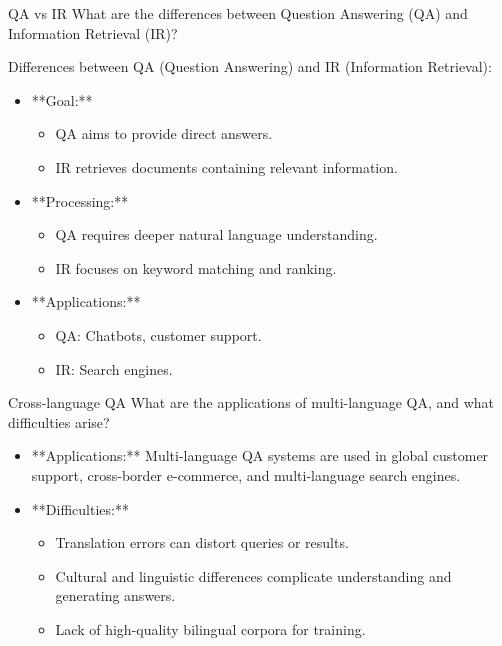 \documentclass{article}
\begin{document}
\begin{exercise}{QA vs IR}
  What are the differences between Question Answering (QA) and Information Retrieval (IR)?

  \begin{solution}
    Differences between QA (Question Answering) and IR (Information Retrieval):
    \begin{itemize}
        \item **Goal:**
        \begin{itemize}
            \item QA aims to provide direct answers.
            \item IR retrieves documents containing relevant information.
        \end{itemize}
        \item **Processing:**
        \begin{itemize}
            \item QA requires deeper natural language understanding.
            \item IR focuses on keyword matching and ranking.
        \end{itemize}
        \item **Applications:**
        \begin{itemize}
            \item QA: Chatbots, customer support.
            \item IR: Search engines.
        \end{itemize}
    \end{itemize}
  \end{solution}
\end{exercise}

\begin{exercise}{Cross-language QA}
  What are the applications of multi-language QA, and what difficulties arise?

  \begin{solution}
    \begin{itemize}
        \item **Applications:** Multi-language QA systems are used in global customer support, cross-border e-commerce, and multi-language search engines.
        \item **Difficulties:**
        \begin{itemize}
            \item Translation errors can distort queries or results.
            \item Cultural and linguistic differences complicate understanding and generating answers.
            \item Lack of high-quality bilingual corpora for training.
        \end{itemize}
    \end{itemize}
  \end{solution}
\end{exercise}
\end{document}
